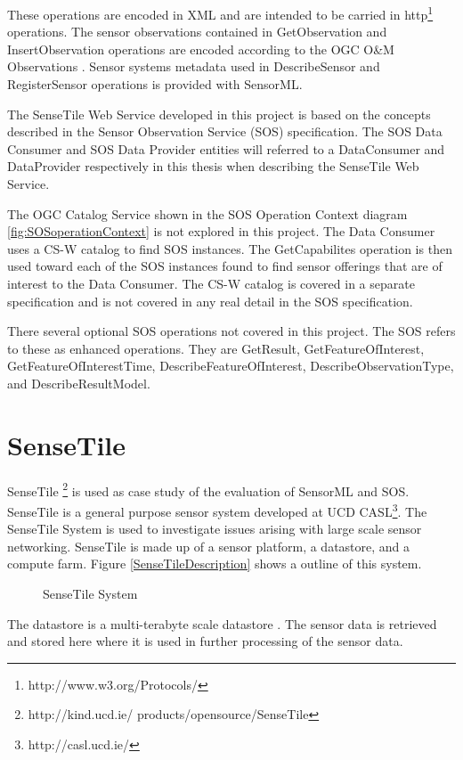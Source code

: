 \documentclass[]{final_report}
\begin{document}
These operations are encoded in XML and are intended to be carried in http\footnote{http://www.w3.org/Protocols/}  operations. The sensor observations contained in GetObservation and InsertObservation operations are encoded according to the OGC O\&M Observations \cite{OMref}. Sensor systems metadata used in DescribeSensor and RegisterSensor operations is provided with SensorML.

The SenseTile Web Service developed in this project is based on the concepts described in the Sensor Observation Service (SOS) specification. The SOS Data Consumer and SOS Data Provider entities will referred to a DataConsumer and DataProvider respectively in this thesis when describing the SenseTile Web Service.
 
The OGC Catalog Service shown in the SOS Operation Context diagram \ref{fig:SOSoperationContext} is not explored in this project. The Data Consumer uses a CS-W catalog to find SOS instances. The GetCapabilites operation is then used toward each of the SOS instances found to find sensor offerings that are of interest to the Data Consumer. The CS-W catalog is covered in a separate specification \cite{OGCcatref} and is not covered in any real detail in the SOS specification. 

There several optional SOS operations not covered in this project. The SOS refers to these as enhanced operations. They are GetResult, GetFeatureOfInterest, GetFeatureOfInterestTime, DescribeFeatureOfInterest, DescribeObservationType, and DescribeResultModel. 


\section{SenseTile}
SenseTile \footnote{http://kind.ucd.ie/
products/opensource/SenseTile} is used as case study of the evaluation of SensorML and SOS. SenseTile is a general purpose sensor system developed at UCD CASL\footnote{http://casl.ucd.ie/}. The SenseTile System is used to investigate issues arising with large scale sensor networking. SenseTile is made up of a sensor platform, a datastore, and a compute farm. Figure \ref{SenseTileDescription} shows a outline of this system. 
\begin{figure}[h]
\centering
{}
\caption{SenseTile System}\label{fig:SenseTileDescription}
\end{figure}
\newpage

The datastore is a multi-terabyte scale datastore . The sensor data is retrieved and stored here where it is used in further processing of the sensor data.
\end{document}
